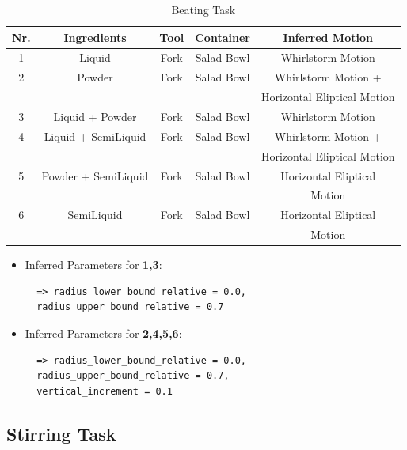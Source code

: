 \begin{table}[H]
  \centering
  \begin{tabular}{|c|c|c|c|c|}
    \hline
    \textbf{Nr.} & \textbf{Ingredients} & \textbf{Tool} & \textbf{Container} & \textbf{Inferred Motion}  \\
    \hline
    1 & Liquid & Fork & Salad Bowl & Whirlstorm Motion \\
    \hline
    2 & Powder & Fork & Salad Bowl & Whirlstorm Motion +
    \\ & & &  & Horizontal Eliptical Motion \\
    \hline
    3 & Liquid + Powder & Fork & Salad Bowl & Whirlstorm Motion \\
    \hline
    4 & Liquid + SemiLiquid & Fork & Salad Bowl & Whirlstorm Motion +
    \\ & & &  & Horizontal Eliptical Motion \\
    \hline
    5 & Powder + SemiLiquid & Fork & Salad Bowl & Horizontal Eliptical 
    \\ & & &  & Motion \\
    
    \hline
    6 & SemiLiquid & Fork & Salad Bowl & Horizontal Eliptical 
    \\ & & &  & Motion \\
    \hline
  \end{tabular}
  \caption{Beating Task}
  \label{tab:mixingtask}
\end{table}

\begin{itemize}
\item Inferred Parameters for \textbf{1,3}: 
 \begin{lstlisting}
  => radius_lower_bound_relative = 0.0, 
  radius_upper_bound_relative = 0.7
\end{lstlisting}
\item Inferred Parameters for \textbf{2,4,5,6}:
\begin{lstlisting}
  => radius_lower_bound_relative = 0.0, 
  radius_upper_bound_relative = 0.7,
  vertical_increment = 0.1
\end{lstlisting}
\end{itemize}

\subsection{Stirring Task}


